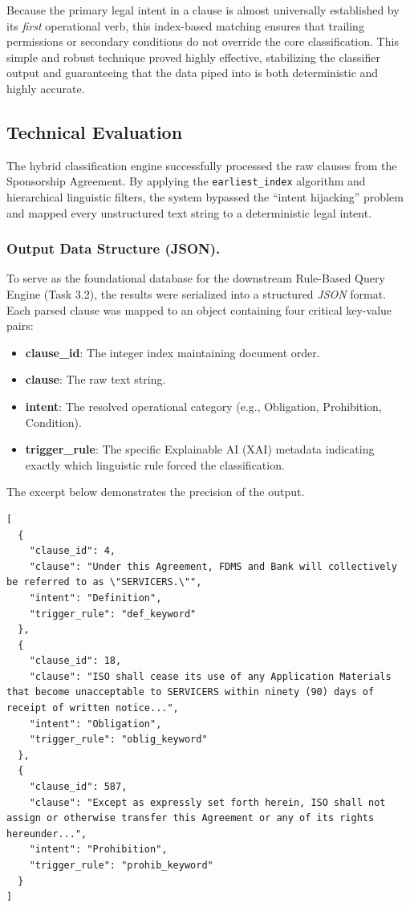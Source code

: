 \documentclass[twoside,final]{hcmut-report}
\newcommand{\result}[1]{\fcolorbox{red}{white}{#1}}
\begin{document}
Because the primary legal intent in a clause is almost universally established by its \emph{first} operational verb, this index-based matching ensures that trailing permissions or secondary conditions do not override the core classification. This simple and robust technique proved highly effective, stabilizing the classifier output and guaranteeing that the data piped into \result{Assignment~\ref{assignment_3}} is both deterministic and highly accurate.

\subsection{Technical Evaluation}
The hybrid classification engine successfully processed the raw clauses from the Sponsorship Agreement. By applying the \texttt{earliest\_index} algorithm and hierarchical linguistic filters, the system bypassed the ``intent hijacking'' problem and mapped every unstructured text string to a deterministic legal intent.

\subsubsection*{Output Data Structure (JSON).}
To serve as the foundational database for the downstream Rule-Based Query Engine (Task 3.2), the results were serialized into a structured \emph{JSON} format. Each parsed clause was mapped to an object containing four critical key-value pairs:
\begin{itemize}[topsep=0pt, parsep=0pt, itemsep=0pt]
  \item \textbf{clause\_id}: The integer index maintaining document order.
  \item \textbf{clause}: The raw text string.
  \item \textbf{intent}: The resolved operational category (e.g., Obligation, Prohibition, Condition).
  \item \textbf{trigger\_rule}: The specific Explainable AI (XAI) metadata indicating exactly which linguistic rule forced the classification.
\end{itemize}

The excerpt below demonstrates the precision of the output.
\begin{verbatim}
[
  {
    "clause_id": 4,
    "clause": "Under this Agreement, FDMS and Bank will collectively be referred to as \"SERVICERS.\"",
    "intent": "Definition",
    "trigger_rule": "def_keyword"
  },
  {
    "clause_id": 18,
    "clause": "ISO shall cease its use of any Application Materials that become unacceptable to SERVICERS within ninety (90) days of receipt of written notice...",
    "intent": "Obligation",
    "trigger_rule": "oblig_keyword"
  },
  {
    "clause_id": 587,
    "clause": "Except as expressly set forth herein, ISO shall not assign or otherwise transfer this Agreement or any of its rights hereunder...",
    "intent": "Prohibition",
    "trigger_rule": "prohib_keyword"
  }
]
\end{verbatim}
\end{document}
